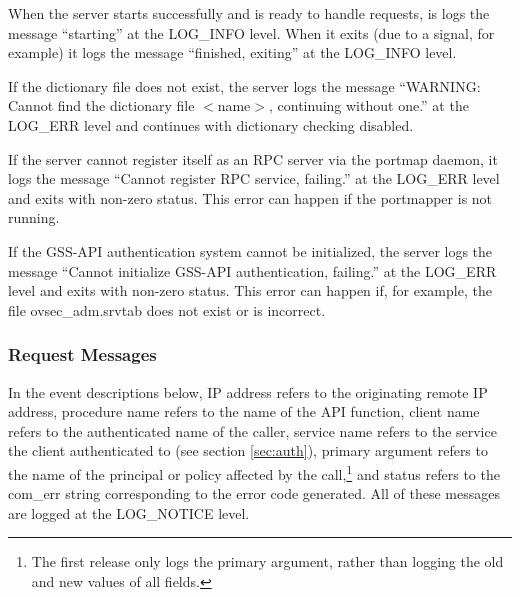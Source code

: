 When the server starts successfully and is ready to handle requests,
is logs the message ``starting'' at the LOG_INFO level.  When it exits
(due to a signal, for example) it logs the message ``finished,
exiting'' at the LOG_INFO level.

If the dictionary file does not exist, the server logs the message
``WARNING: Cannot find the dictionary file $<$name$>$, continuing
without one.'' at the LOG_ERR level and continues with dictionary
checking disabled.

If the server cannot register itself as an RPC server via the portmap
daemon, it logs the message ``Cannot register RPC service, failing.''
at the LOG_ERR level and exits with non-zero status.  This error can
happen if the portmapper is not running.

If the GSS-API authentication system cannot be initialized, the server
logs the message ``Cannot initialize GSS-API authentication,
failing.'' at the LOG_ERR level and exits with non-zero status.  This
error can happen if, for example, the file ovsec_adm.srvtab does not
exist or is incorrect.

\subsubsection{Request Messages}

In the event descriptions below, IP address refers to the originating
remote IP address, procedure name refers to the name of the API
function, client name refers to the authenticated name of the caller,
service name refers to the service the client authenticated to (see
section \ref{sec:auth}), primary argument refers to the name of the
principal or policy affected by the call,\footnote{The first release
only logs the primary argument, rather than logging the old and new
values of all fields.} and status refers to the com_err string
corresponding to the error code generated.  All of these messages are
logged at the LOG_NOTICE level.

